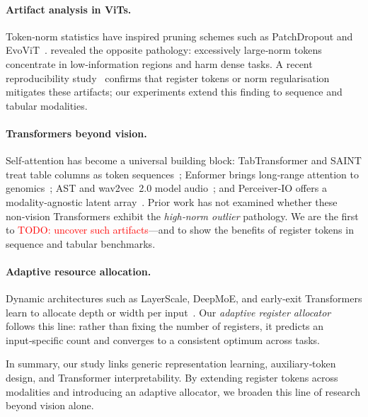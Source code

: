 \documentclass{article}
\newcommand{\citet}{\textcite}
\newcommand{\citep}{\parencite}
\newcommand{\todo}[1]{\textcolor{red}{TODO: #1}}
\begin{document}
\paragraph{Artifact analysis in ViTs.}
Token‑norm statistics have inspired pruning schemes such as PatchDropout and EvoViT \citep{liuPatchDropoutEconomizingVision2023,xuEvoViTSlowfastToken2022}.  
\citet{darcetVisionTransformersNeed2024} revealed the opposite pathology: excessively large‑norm tokens concentrate in low‑information regions and harm dense tasks.  
A recent reproducibility study \citep{ReproducibilityStudyVision2025} confirms that register tokens or norm regularisation mitigates these artifacts; our experiments extend this finding to sequence and tabular modalities.

\paragraph{Transformers beyond vision.}
Self‑attention has become a universal building block:  
TabTransformer and SAINT treat table columns as token sequences \citep{huangTabTransformerTabularData2020,somepalliSAINTImprovedNeural2021};  
Enformer brings long‑range attention to genomics \citep{avsecEffectiveGeneExpression2021};  
AST and wav2vec 2.0 model audio \citep{gongASTAudioSpectrogram2021,baevskiWav2vec20Framework2020a};  
and Perceiver‑IO offers a modality‑agnostic latent array \citep{jaeglePerceiverIOGeneral2021}.  
Prior work has not examined whether these non‑vision Transformers exhibit the \emph{high‑norm outlier} pathology.  
We are the first to \todo{uncover such artifacts}—and to show the benefits of register tokens in sequence and tabular benchmarks.

\paragraph{Adaptive resource allocation.}
Dynamic architectures such as LayerScale, DeepMoE, and early‑exit Transformers learn to allocate depth or width per input \citep{touvronGoingDeeperImage2021, wangDeepMixtureExperts2019}.  
Our \emph{adaptive register allocator} follows this line: rather than fixing the number of registers, it predicts an input‑specific count and converges to a consistent optimum across tasks.

\smallskip
In summary, our study links generic representation learning, auxiliary‑token design, and Transformer interpretability.  
By extending register tokens across modalities and introducing an adaptive allocator, we broaden this line of research beyond vision alone.
\end{document}
